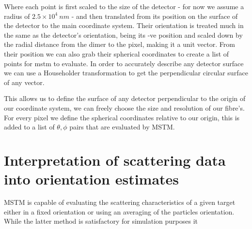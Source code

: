 Where each point is first scaled to the size of the detector - for now we assume a radius of $2.5 \times 10^4 \ nm$ - and then translated from its position on the surface of the detector to the main coordinate system. Their orientation is treated much in the same as the detector's orientation, being its -ve position and scaled down by the radial distance from the dimer to the pixel, making it a unit vector. From their position we can also grab their spherical coordinates to create a list of points for mstm to evaluate. In order to accurately describe any detector surface we can use a Householder transformation to get the perpendicular circular surface of any vector.

This allows us to define the surface of any detector perpendicular to the origin of our coordinate system, we can freely choose the size and resolution of our fibre's. For every pixel we define the spherical coordinates relative to our origin, this is added to a list of $\theta, \phi$ pairs that are evaluated by MSTM. 

\section{Interpretation of scattering data into orientation estimates}
MSTM is capable of evaluating the scattering characteristics of a given target either in a fixed orientation or using an averaging of the particles orientation. While the latter method is satisfactory for simulation purposes it 

